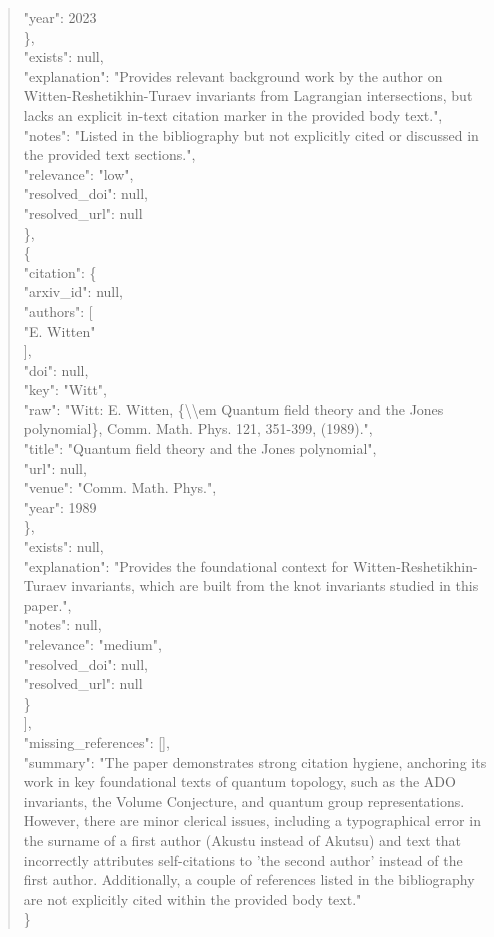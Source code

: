 \documentclass[11pt]{article}
\begin{document}
\begin{quote}
        "year": 2023\\
      \},\\
      "exists": null,\\
      "explanation": "Provides relevant background work by the author on Witten-Reshetikhin-Turaev invariants from Lagrangian intersections, but lacks an explicit in-text citation marker in the provided body text.",\\
      "notes": "Listed in the bibliography but not explicitly cited or discussed in the provided text sections.",\\
      "relevance": "low",\\
      "resolved\_doi": null,\\
      "resolved\_url": null\\
    \},\\
    \{\\
      "citation": \{\\
        "arxiv\_id": null,\\
        "authors": [\\
          "E. Witten"\\
        ],\\
        "doi": null,\\
        "key": "Witt",\\
        "raw": "Witt: E. Witten, \{\textbackslash{}\textbackslash{}em Quantum field theory and the Jones polynomial\}, Comm. Math. Phys. 121, 351-399, (1989).",\\
        "title": "Quantum field theory and the Jones polynomial",\\
        "url": null,\\
        "venue": "Comm. Math. Phys.",\\
        "year": 1989\\
      \},\\
      "exists": null,\\
      "explanation": "Provides the foundational context for Witten-Reshetikhin-Turaev invariants, which are built from the knot invariants studied in this paper.",\\
      "notes": null,\\
      "relevance": "medium",\\
      "resolved\_doi": null,\\
      "resolved\_url": null\\
    \}\\
  ],\\
  "missing\_references": [],\\
  "summary": "The paper demonstrates strong citation hygiene, anchoring its work in key foundational texts of quantum topology, such as the ADO invariants, the Volume Conjecture, and quantum group representations. However, there are minor clerical issues, including a typographical error in the surname of a first author (Akustu instead of Akutsu) and text that incorrectly attributes self-citations to 'the second author' instead of the first author. Additionally, a couple of references listed in the bibliography are not explicitly cited within the provided body text."\\
\}\\
\end{quote}
\end{document}
